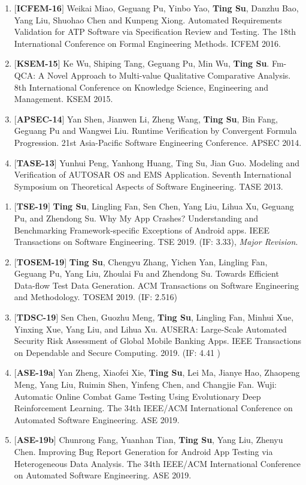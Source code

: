\documentclass[margin]{res}
\begin{document}
\begin{resume}
\begin{enumerate}[leftmargin=*]
    \item $[$\textbf{ICFEM-16}$]$ Weikai Miao, Geguang Pu, Yinbo Yao, \textbf{Ting Su}, Danzhu Bao, Yang Liu, Shuohao Chen and Kunpeng Xiong. Automated Requirements Validation for ATP Software via Specification Review and Testing. The 18th International Conference on Formal Engineering Methods. ICFEM 2016. 
    \item $[$\textbf{KSEM-15}$]$ Ke Wu, Shiping Tang, Geguang Pu, Min Wu, \textbf{Ting Su}. Fm-QCA: A Novel Approach to Multi-value Qualitative Comparative Analysis. 8th International Conference on Knowledge Science, Engineering and Management. KSEM 2015. 
    \item $[$\textbf{APSEC-14}$]$ Yan Shen, Jianwen Li, Zheng Wang, \textbf{Ting Su}, Bin Fang, Geguang Pu and Wangwei Liu. Runtime Verification by Convergent Formula Progression. 21st Asia-Pacific Software Engineering Conference. APSEC 2014. 
    \item $[$\textbf{TASE-13}$]$ Yunhui Peng, Yanhong Huang, Ting Su, Jian Guo. Modeling and Verification of AUTOSAR OS and EMS Application. Seventh International Symposium on Theoretical Aspects of Software Engineering. TASE 2013. 
\end{enumerate}

\begin{enumerate}[leftmargin=*]
    \item $[$\textbf{TSE-19}$]$ \textbf{Ting Su}, Lingling Fan, Sen Chen, Yang Liu, Lihua Xu, Geguang Pu, and Zhendong Su. Why My App Crashes? Understanding and Benchmarking Framework-specific Exceptions of Android apps. IEEE Transactions on Software Engineering. TSE 2019. (IF: 3.33), \emph{Major Revision}.
    \item $[$\textbf{TOSEM-19}$]$ \textbf{Ting Su}, Chengyu Zhang, Yichen Yan, Lingling Fan, Geguang Pu, Yang Liu, Zhoulai Fu and Zhendong Su. Towards Efficient Data-flow Test Data Generation. ACM Transactions on Software Engineering and Methodology. TOSEM 2019. (IF: 2.516)
    \item $[$\textbf{TDSC-19}$]$ Sen Chen, Guozhu Meng, \textbf{Ting Su}, Lingling Fan, Minhui Xue, Yinxing Xue, Yang Liu, and Lihua Xu. AUSERA: Large-Scale Automated Security Risk Assessment of Global Mobile Banking Apps. IEEE Transactions on Dependable and Secure Computing. 2019. (IF: 4.41
    )
    \item $[$\textbf{ASE-19a}$]$ Yan Zheng, Xiaofei Xie, \textbf{Ting Su}, Lei Ma, Jianye Hao, Zhaopeng Meng, Yang Liu, Ruimin Shen, Yinfeng Chen, and Changjie Fan. Wuji: Automatic Online Combat Game Testing Using Evolutionary Deep Reinforcement Learning. The 34th IEEE/ACM International Conference on Automated Software Engineering. ASE 2019.
    \item $[$\textbf{ASE-19b}$]$ Chunrong Fang, Yuanhan Tian, \textbf{Ting Su}, Yang Liu, Zhenyu Chen. Improving Bug Report Generation for Android App Testing via Heterogeneous Data Analysis. The 34th IEEE/ACM International Conference on Automated Software Engineering. ASE 2019.
\end{enumerate}


\end{resume}
\end{document}
